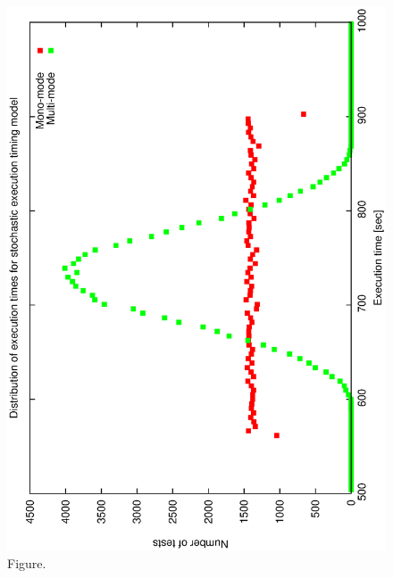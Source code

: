 \documentclass[12pt,a4paper]{article}
\begin{document}
\clearpage
\begin{figure}[htbp]
 \begin{center}
  \includegraphics[scale=1.0, angle=0]{figures/simf_exec_plot.eps}
 \end{center}
  \caption[Figure.]
{Figure.}
\end{figure}
\clearpage
\end{document}
